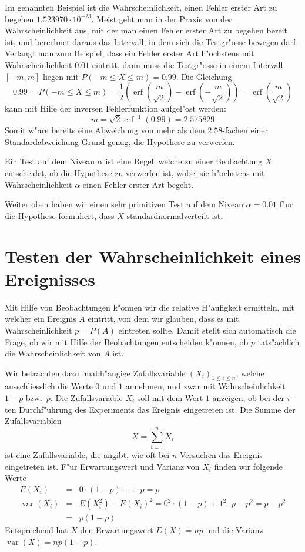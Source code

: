 Im genannten Beispiel ist die Wahrscheinlichkeit, einen Fehler erster
Art zu begehen $1.523970\cdot 10^{-23}$. Meist geht man in der Praxis von der
Wahrscheinlichkeit aus, mit der man einen Fehler erster Art zu begehen
bereit ist, und berechnet daraus das Intervall, in dem sich die
Testgr"osse bewegen darf. Verlangt man zum Beispiel, dass ein Fehler erster
Art h"ochstens mit Wahrscheinlichkeit $0.01$ eintritt, dann muss die 
Testgr"osse in einem Intervall $[-m,m]$ liegen mit $P(-m\le X\le m)=0.99$.
Die Gleichung
\[
0.99 = P(-m\le X\le m)
=\frac12\left(\operatorname{erf}(\frac{m}{\sqrt{2}})-\operatorname{erf}(-\frac{m}{\sqrt{2}})\right)
=\operatorname{erf}(\frac{m}{\sqrt{2}})
\]
kann mit Hilfe der inversen Fehlerfunktion aufgel"ost werden:
\[
m=\sqrt{2}\operatorname{erf}^{-1}(0.99)=2.575829
\]
Somit w"are bereits eine Abweichung von mehr als dem $2.58$-fachen einer
Standardabweichung Grund genug, die Hypothese zu verwerfen.

\begin{definition}
Ein Test auf dem Niveau $\alpha$ ist eine Regel, welche zu einer
Beobachtung $X$ entscheidet, ob die Hypothese zu verwerfen ist, wobei
sie h"ochstens mit Wahrscheinlichkeit $\alpha$ einen Fehler erster
Art begeht.
\end{definition}

Weiter oben haben wir einen sehr primitiven Test auf dem Niveau
$\alpha=0.01$ f"ur die
Hypothese formuliert, dass $X$ standardnormalverteilt ist.

\section{Testen der Wahrscheinlichkeit eines Ereignisses}
Mit Hilfe von Beobachtungen k"onnen wir die relative H"aufigkeit ermitteln, mit
welcher ein Ereignis $A$ eintritt, von dem wir glauben, dass es mit
Wahrscheinlichkeit $p=P(A)$ eintreten sollte.
Damit stellt sich automatisch die Frage, ob wir mit Hilfe der
Beobachtungen entscheiden k"onnen, ob $p$ tats"achlich die Wahrscheinlichkeit
von $A$ ist.

Wir betrachten dazu unabh"angige Zufallsvariable $(X_i)_{1\le i\le n}$,
welche ausschliesslich
die Werte $0$ und $1$ annehmen, und zwar mit Wahrscheinlichkeit
$1-p$ bzw.~$p$. Die Zufallsvariable $X_i$ soll mit dem Wert $1$ anzeigen,
ob bei der $i$-ten Durchf"uhrung des Experiments das Ereignis eingetreten ist.
Die Summe der Zufallsvariablen 
\[
X=\sum_{i=1}^nX_i
\]
ist eine Zufallsvariable, die angibt, wie oft bei $n$ Versuchen das Ereignis
eingetreten ist. F"ur Erwartungswert und Varianz von $X_i$ finden
wir folgende Werte
\begin{eqnarray*}
E(X_i)&=&0\cdot (1-p)+1\cdot p=p\\
\operatorname{var}(X_i)&=&E(X_i^2)-E(X_i)^2=0^2\cdot (1-p)+1^2\cdot p-p^2
=p-p^2\\
&=&p(1-p)
\end{eqnarray*}
Entsprechend hat $X$ den Erwartungswert $E(X)=np$ und
die Varianz $\operatorname{var}(X)=np(1-p)$.

